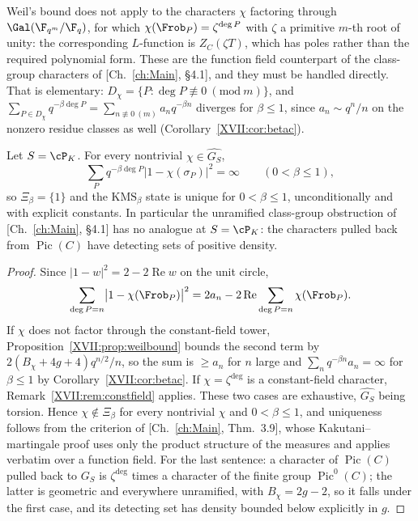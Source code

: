 \begin{remark}\label{XVII:rem:constfield}
Weil's bound does not apply to the characters $\chi$ factoring through
$\Gal(\F_{q^m}/\F_q)$, for which $\chi(\Frob_P)=\zeta^{\deg P}$ with $\zeta$ a primitive
$m$-th root of unity: the corresponding $L$-function is $Z_C(\zeta T)$, which has poles
rather than the required polynomial form. These are the function field counterpart of the
class-group characters of [Ch.~\ref{ch:Main}, \S4.1], and they must be handled directly. That is
elementary: $D_\chi=\{P:\deg P\not\equiv0\ (\mathrm{mod}\ m)\}$, and
$\sum_{P\in D_\chi}q^{-\beta\deg P}=\sum_{n\not\equiv0\ (m)}a_nq^{-\beta n}$ diverges for
$\beta\le1$, since $a_n\sim q^n/n$ on the nonzero residue classes as well
(Corollary~\ref{XVII:cor:betac}).
\end{remark}

\begin{theorem}\label{XVII:thm:uniqueness}
Let $S=\cP_K$. For every nontrivial $\chi\in\widehat{G_S}$,
\[
\sum_{P}q^{-\beta\deg P}\bigl|1-\chi(\sigma_P)\bigr|^2=\infty\qquad(0<\beta\le1),
\]
so $\Xi_\beta=\{1\}$ and the $\mathrm{KMS}_\beta$ state is unique for $0<\beta\le1$,
unconditionally and with explicit constants. In particular the unramified class-group
obstruction of [Ch.~\ref{ch:Main}, \S4.1] has no analogue at $S=\cP_K$: the characters pulled back
from $\operatorname{Pic}(C)$ have detecting sets of positive density.
\end{theorem}

\begin{proof}
Since $|1-w|^2=2-2\operatorname{Re}w$ on the unit circle,
\[
\sum_{\deg P=n}\bigl|1-\chi(\Frob_P)\bigr|^2
=2a_n-2\operatorname{Re}\sum_{\deg P=n}\chi(\Frob_P).
\]
If $\chi$ does not factor through the
constant-field tower, Proposition~\ref{XVII:prop:weilbound} bounds the second term by
$2(B_\chi+4g+4)q^{n/2}/n$, so the sum is $\ge a_n$ for $n$ large and
$\sum_nq^{-\beta n}a_n=\infty$ for $\beta\le1$ by Corollary~\ref{XVII:cor:betac}. If
$\chi=\zeta^{\deg}$ is a constant-field character, Remark~\ref{XVII:rem:constfield} applies.
These two cases are exhaustive, $\widehat{G_S}$ being torsion. Hence $\chi\notin\Xi_\beta$
for every nontrivial $\chi$ and $0<\beta\le1$, and uniqueness follows from the criterion of
[Ch.~\ref{ch:Main}, Thm.~3.9], whose Kakutani--martingale proof uses only the product structure of
the measures and applies verbatim over a function field. For the last sentence: a character
of $\operatorname{Pic}(C)$ pulled back to $G_S$ is $\zeta^{\deg}$ times a character of the
finite group $\operatorname{Pic}^0(C)$; the latter is geometric and everywhere unramified,
with $B_\chi=2g-2$, so it falls under the first case, and its detecting set has density
bounded below explicitly in $g$.
\end{proof}

